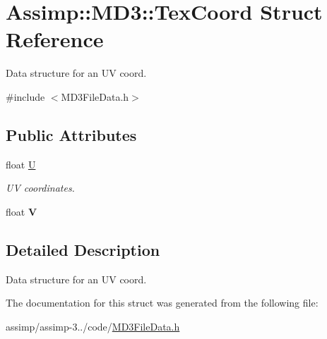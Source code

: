 \hypertarget{struct_assimp_1_1_m_d3_1_1_tex_coord}{\section{Assimp\+:\+:M\+D3\+:\+:Tex\+Coord Struct Reference}
\label{struct_assimp_1_1_m_d3_1_1_tex_coord}
}


Data structure for an U\+V coord.  




{\ttfamily \#include $<$M\+D3\+File\+Data.\+h$>$}

\subsection*{Public Attributes}
\begin{DoxyCompactItemize}
\item 
\hypertarget{struct_assimp_1_1_m_d3_1_1_tex_coord_a58fd66d24ee9da7ab32f2d29b931b2bb}{float \hyperlink{struct_assimp_1_1_m_d3_1_1_tex_coord_a58fd66d24ee9da7ab32f2d29b931b2bb}{U}}\label{struct_assimp_1_1_m_d3_1_1_tex_coord_a58fd66d24ee9da7ab32f2d29b931b2bb}

\begin{DoxyCompactList}\small\item\em U\+V coordinates. \end{DoxyCompactList}\item 
\hypertarget{struct_assimp_1_1_m_d3_1_1_tex_coord_ab9716f78a7831779de306bbed0208270}{float {\bfseries V}}\label{struct_assimp_1_1_m_d3_1_1_tex_coord_ab9716f78a7831779de306bbed0208270}

\end{DoxyCompactItemize}


\subsection{Detailed Description}
Data structure for an U\+V coord. 

The documentation for this struct was generated from the following file\+:\begin{DoxyCompactItemize}
\item 
assimp/assimp-\/3../code/\hyperlink{_m_d3_file_data_8h}{M\+D3\+File\+Data.\+h}\end{DoxyCompactItemize}
